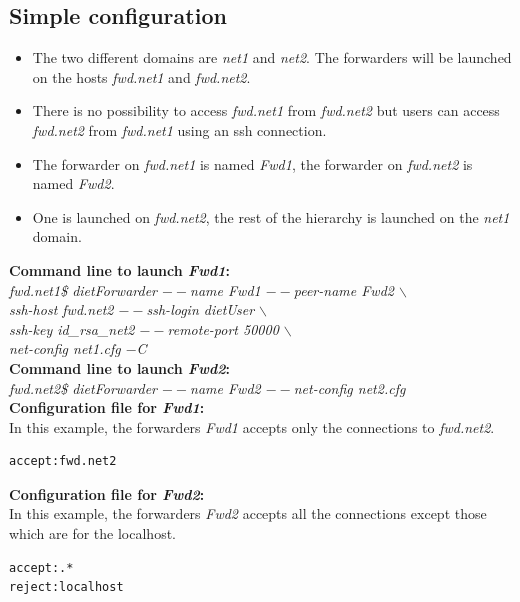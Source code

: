 \subsection{Simple configuration}
\begin{itemize}
\item The two different domains are \textit{net1} and \textit{net2}. The forwarders will
  be launched on the hosts \textit{fwd.net1} and \textit{fwd.net2}.
\item There is no possibility to access \textit{fwd.net1} from
  \textit{fwd.net2} but users can access \textit{fwd.net2} from
  \textit{fwd.net1} using an ssh connection.
\item The forwarder on \textit{fwd.net1} is named \textit{Fwd1}, the
  forwarder on \textit{fwd.net2} is named \textit{Fwd2}.
\item One \sed is launched on \textit{fwd.net2}, the rest of the \diet
  hierarchy is launched on the \textit{net1} domain.\\
\end{itemize}

\noindent\textbf{Command line to launch \textit{Fwd1}: }\\
{\small \it fwd.net1\$ dietForwarder {\tiny$--$}name Fwd1
  {\tiny$--$}peer-name Fwd2 $\backslash$\\
  \hspace*{4.2cm}{\tiny$--$}ssh-host fwd.net2 {\tiny$--$}ssh-login
  dietUser $\backslash$\\
  \hspace*{4.2cm}{\tiny$--$}ssh-key id\_rsa\_net2
  {\tiny$--$}remote-port 50000 $\backslash$\\
  \hspace*{4.2cm}{\tiny$--$}net-config net1.cfg {\tiny$-$}C}\\[2mm]
\noindent\textbf{Command line to launch \textit{Fwd2}: }\\
{\small \it fwd.net2\$ dietForwarder {\tiny$--$}name Fwd2
  {\tiny$--$}net-config net2.cfg}\\[3mm]
\noindent\textbf{Configuration file for \textit{Fwd1}:}\\
In this example, the forwarders \textit{Fwd1} accepts only the
connections to \textit{fwd.net2}.
\begin{verbatim}
accept:fwd.net2
\end{verbatim}

\noindent\textbf{Configuration file for \textit{Fwd2}:}\\
In this example, the forwarders \textit{Fwd2} accepts all the
connections except those which are for the localhost.
\begin{verbatim}
accept:.*
reject:localhost
\end{verbatim}

